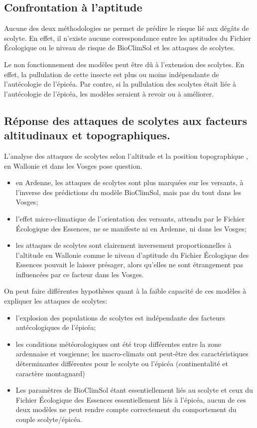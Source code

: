 \subsection{Confrontation à l'aptitude}
Aucune des deux méthodologies ne permet de prédire le risque lié aux dégâts de scolyte. En effet, il n'existe aucune correspondance entre les aptitudes du Fichier Écologique ou  le niveau de risque de BioClimSol et les attaques de scolytes.

Le non fonctionnement des modèles peut être dû à l'extension des scolytes. En effet, la pullulation de cette insecte est plus ou moins indépendante de l'autécologie de l'épicéa. 
Par contre, si la pullulation des scolytes était liée à l'autécologie de l'épicéa, les modèles seraient à revoir ou à améliorer.

\subsection{Réponse des attaques de scolytes aux facteurs altitudinaux et topographiques.}

L'analyse des attaques de scolytes selon l'altitude et la position topographique , en Wallonie et dans les Vosges pose question.
\begin{itemize}
	\item en Ardenne, les attaques de scolytes sont plus marquées sur les versants, à l'inverse des prédictions du modèle BioClimSol, mais pas du tout dans les Vosges;
	
	\item l'effet micro-climatique de l'orientation des versants, attendu par le Fichier Écologique des Essences, ne se manifeste ni en Ardenne, ni dans les Vosges;
	
	\item les attaques de scolytes sont clairement inversement proportionnelles à l'altitude en Wallonie comme le niveau d'aptitude du Fichier Écologique des Essences pouvait le laisser présager, alors qu'elles ne sont étrangement pas influencées par ce facteur dans les Vosges.
	
\end{itemize}
On peut faire différentes hypothèses quant à la faible capacité de ces modèles à expliquer les attaques de scolytes:

\begin{itemize}
	\item l'explosion des populations de scolytes est indépendante des facteurs autécologiques de l'épicéa;
	\item les conditions météorologiques ont été trop différentes entre la zone ardennaise et vosgienne; les macro-climats ont peut-être des caractéristiques déterminantes différentes pour le scolyte ou l'épicéa (continentalité et caractère montagnard)
	\item Les paramètres de BioClimSol étant essentiellement liés au scolyte et ceux du Fichier Écologique des Essences essentiellement liés à l'épicéa, aucun de ces deux modèles ne peut rendre compte correctement du comportement du couple    scolyte/épicéa.
\end{itemize}

